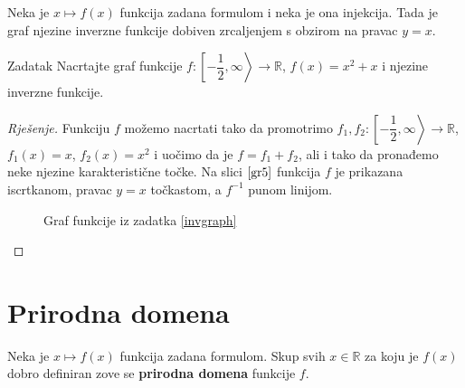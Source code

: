 \begin{remark}
Neka je \(x\mapsto f(x)\) funkcija zadana formulom i neka je ona injekcija. Tada je graf njezine inverzne funkcije dobiven zrcaljenjem s obzirom na pravac \(y=x\).
\end{remark}
\begin{exercise}{Zadatak}
\label{invgraph}
Nacrtajte graf funkcije \(f : \left[-\dfrac{1}{2}, \infty\right\rangle\to \mathbb{R}\), \(f(x)=x^2+x\) i njezine inverzne funkcije.
\end{exercise}
\begin{proof}[Rješenje]
Funkciju \(f\) možemo nacrtati tako da promotrimo \(f_1, f_2 : \left[-\dfrac{1}{2}, \infty\right\rangle\to \mathbb{R}\), \(f_1(x)=x\), \(f_2(x)=x^2\) i uočimo da je \(f=f_1+f_2\), ali i tako da pronađemo neke njezine karakteristične točke. Na slici \(\ref{gr5}\) funkcija \(f\) je prikazana iscrtkanom, pravac \(y=x\) točkastom, a \(f^{-1}\) punom linijom.
\begin{figure}[ht]
\begin{center}
\end{center}
\caption{\label{gr5} Graf funkcije iz zadatka \ref{invgraph}}
\end{figure}
\end{proof}
\section{Prirodna domena}
\begin{remark}
Neka je \(x\mapsto f(x)\) funkcija zadana formulom. Skup svih \(x\in \mathbb{R}\) za koju je \(f(x)\) dobro definiran zove se \textbf{prirodna domena} funkcije \(f\).
\end{remark}

